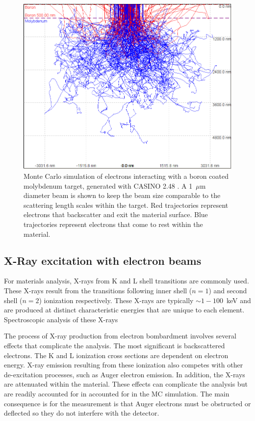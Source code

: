 \documentclass[12pt,letterpaper,final]{article}
\begin{document}
\begin{figure}[!h]
 \centering
  \includegraphics[width=\columnwidth]{figures/ElectronsInTargetWide.png}
 \caption{Monte Carlo simulation of electrons interacting with a boron coated molybdenum target, generated with CASINO 2.48 \cite{CASINO}. A 1~$\mu$m diameter beam is shown to keep the beam size comparable to the scattering length scales within the target. Red trajectories represent electrons that backscatter and exit the material surface. Blue trajectories represent electrons that come to rest within the material.}
\label{fig:ElectronsInTarget}
\end{figure}

\subsection{X-Ray excitation with electron beams}

For materials analysis, X-rays from K and L shell transitions are commonly used. These X-rays result from the transitions following inner shell ($n=1$) and second shell ($n=2$) ionization respectively. These X-rays are typically $\sim 1 - 100$~keV and are produced at distinct characteristic energies that are unique to each element. Spectroscopic analysis of these X-rays 

The process of X-ray production from electron bombardment involves several effects that complicate the analysis. The most significant is backscattered electrons. The K and L ionization cross sections are dependent on electron energy. X-ray emission resulting from these ionization also competes with other de-excitation processes, such as Auger electron emission. In addition, the X-rays are attenuated within the material. These effects can complicate the analysis but are readily accounted for in accounted for in the MC simulation. The main consequence is for the measurement is that Auger electrons must be obstructed or deflected so they do not interfere with the detector.
\end{document}
